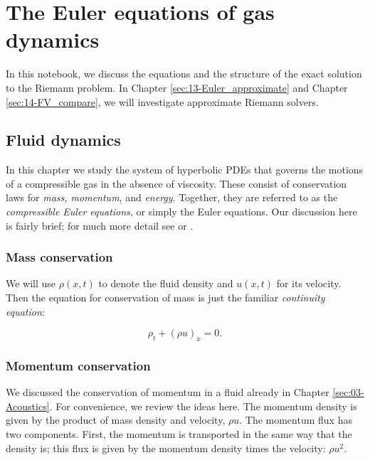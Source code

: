 \documentclass{SIAMbook2016}
\begin{document}
\hypertarget{the-euler-equations-of-gas-dynamics}{%
\chapter{The Euler equations of gas
dynamics}\label{the-euler-equations-of-gas-dynamics}}
\label{sec:09-Euler}

In this notebook, we discuss the equations and the structure of the
exact solution to the Riemann problem. In
Chapter \ref{sec:13-Euler_approximate} and
Chapter \ref{sec:14-FV_compare}, we will investigate approximate Riemann
solvers.

\hypertarget{fluid-dynamics}{%
\section{Fluid dynamics}\label{fluid-dynamics}}

In this chapter we study the system of hyperbolic PDEs that governs the
motions of a compressible gas in the absence of viscosity. These consist
of conservation laws for \emph{mass, momentum}, and \emph{energy}.
Together, they are referred to as the \emph{compressible Euler
equations}, or simply the Euler equations. Our discussion here is fairly
brief; for much more detail see \cite{fvmhp} or \cite{toro2013riemann}.

\hypertarget{mass-conservation}{%
\subsection{Mass conservation}\label{mass-conservation}}

We will use \(\rho(x,t)\) to denote the fluid density and \(u(x,t)\) for
its velocity. Then the equation for conservation of mass is just the
familiar \emph{continuity equation}:

\[\rho_t + (\rho u)_x = 0.\]

\hypertarget{momentum-conservation}{%
\subsection{Momentum conservation}\label{momentum-conservation}}

We discussed the conservation of momentum in a fluid already in
Chapter \ref{sec:03-Acoustics}. For convenience, we review the ideas
here. The momentum density is given by the product of mass density and
velocity, \(\rho u\). The momentum flux has two components. First, the
momentum is transported in the same way that the density is; this flux
is given by the momentum density times the velocity: \(\rho u^2\).
\end{document}
